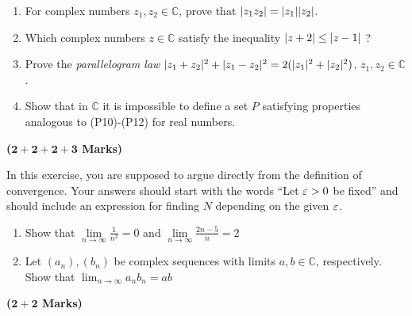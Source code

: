 \documentclass[a4paper]{article}
\renewcommand{\C}{\mathbb{C}}
\begin{document}
\begin{Exercise}\vspace*{0cm}\indent\par
\begin{enumerate}
\item For complex numbers $z_1,z_2\in\C$, prove that $\lvert z_1z_2\rvert=\lvert z_1\rvert\lvert z_2\rvert$.
\item Which complex numbers $z\in\C$ satisfy the inequality
$\lvert z + 2\rvert \le \lvert z - 1\rvert$ ?
\item Prove the \emph{parallelogram law} $\lvert z_1+z_2\rvert^2+\lvert z_1-z_2\rvert^2=2(\lvert z_1\rvert^2+\lvert z_2\rvert^2)$, $z_1,z_2\in\C$.
\item Show that in $\C$ it is impossible to define a set $P$ satisfying properties analogous to (P10)-(P12) for real numbers.
\end{enumerate}
\textbf{($\boldsymbol{2+2+2+3}$ Marks)}
\end{Exercise}



\begin{Exercise}
In this exercise, you are supposed to argue directly from the
definition of convergence. Your answers should start with the words
``Let $\varepsilon>0$ be fixed'' and should include an expression for
finding $N$ depending on the given $\varepsilon$.
\begin{enumerate}
\item Show that $\lim\limits_{n\to\infty}\frac{1}{n^2}=0$ and $\lim\limits_{n\to\infty}\frac{2n-5}{n}=2$
\item Let $(a_n), (b_n)$ be complex sequences with limits $a,b \in \C$, respectively.
      Show that
      $\displaystyle\lim_{n \to \infty} a_n b_n = ab$
\end{enumerate}
\textbf{($\boldsymbol{2+2}$ Marks)}
\end{Exercise}
\end{document}
